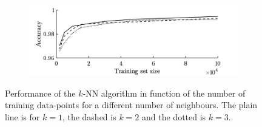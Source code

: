 \begin{figure}[h!]
        \begin{subfigure}[b]{.97\textwidth}  
            \centering 
            \includegraphics[width=.98\textwidth]{parts/chap-4/img-knn/knn-acc.png}
        \end{subfigure}
        \caption[Results of $k$-NN.]{Performance of the $k$-NN algorithm in function of the number of training data-points for a different number of neighbours. The plain line is for $k=1$, the dashed is $k=2$ and the dotted is $k=3$.}
        \label{fig:knn}
\end{figure}

